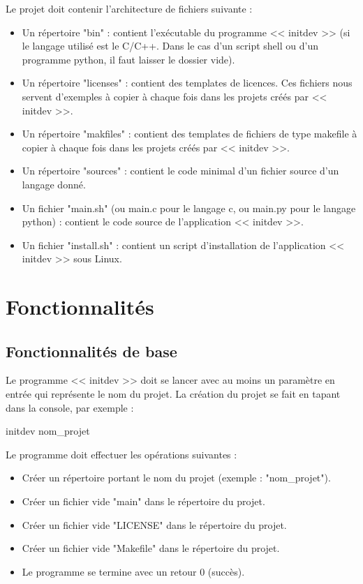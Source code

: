 \documentclass[10pt,a4paper]{article}
\begin{document}
Le projet doit contenir l'architecture de fichiers suivante : 
\begin{itemize}
  \item Un répertoire "bin" : contient l'exécutable du programme << initdev >> (si le langage utilisé est le C/C++. Dans le cas d'un script shell ou d'un programme python, il faut laisser le dossier vide).
  \item Un répertoire "licenses" : contient des templates de licences. Ces fichiers nous servent d'exemples à copier à chaque fois dans les projets créés par << initdev >>.
  \item Un répertoire "makfiles" : contient des templates de fichiers de type makefile à copier à chaque fois dans les projets créés par << initdev >>. 
  \item Un répertoire "sources" : contient le code minimal d'un fichier source d'un langage donné. 
  \item Un fichier "main.sh" (ou main.c pour le langage c, ou main.py pour le langage python) : contient le code source de l'application << initdev >>. 
  \item Un fichier "install.sh" : contient un script d'installation de l'application << initdev >> sous Linux.
\end{itemize}


\section{Fonctionnalités}
\label{sec:fct}
\subsection{Fonctionnalités de base}
Le programme << initdev >> doit se lancer avec au moins un paramètre en entrée qui représente le nom du projet. La création du projet se fait en tapant dans la console, par exemple : 
  \begin{center}
    initdev nom\_projet
  \end{center}
  
  Le programme doit effectuer les opérations suivantes :
  \begin{itemize}
    \item Créer un répertoire portant le nom du projet (exemple : "nom\_projet").
    \item Créer un fichier vide "main" dans le  répertoire du projet.
    \item Créer un fichier vide "LICENSE" dans le  répertoire du projet.
    \item Créer un fichier vide "Makefile" dans le  répertoire du projet.
    \item Le programme se termine avec un retour $0$ (succès).
  \end{itemize}
\end{document}
